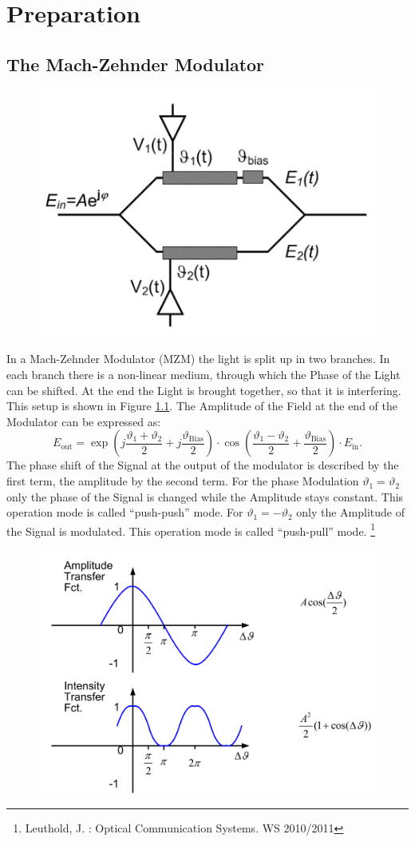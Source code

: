 \chapter{Preparation}
\section{The Mach-Zehnder Modulator}
\begin{figure}
  \centering
  \includegraphics[width=.5\columnwidth]{Grafiken/Mach-Zehnder.jpg}

\caption{}
\label{fig:MZI}
\end{figure}
In a Mach-Zehnder Modulator (MZM) the light is split up in two branches. In each branch there is a non-linear medium, through which the Phase of the Light can be shifted. At the end the Light is brought together, so that it is interfering. This setup is shown in Figure \ref{fig:MZI}. The Amplitude of the Field at the end of the Modulator can be expressed as:
\begin{equation}
 E_{\mathrm{out}}=\exp\left(j\frac{\vartheta_1+\vartheta_2}{2}+j\frac{\vartheta_{\mathrm{Bias}}}{2} \right)\cdot\cos\left(\frac{\vartheta_1-\vartheta_2}{2}+\frac{\vartheta_{\mathrm{Bias}}}{2}\right)\cdot E_{\mathrm{in}} .
\end{equation}
The phase shift of the Signal at the output of the modulator is described by the first term, the amplitude by the second term. For the phase Modulation $\vartheta_1 = \vartheta_2$ only the phase of the Signal is changed while the Amplitude stays constant. This operation mode is called "`push-push"' mode. For $\vartheta_1 = -\vartheta_2$ only the Amplitude of the Signal is modulated. This operation mode is called "`push-pull"' mode. \footnote[1]{Leuthold, J. : Optical Communication Systems. WS 2010/2011}


\begin{figure}
  \centering
  \includegraphics[width=.5\columnwidth]{Grafiken/Mach-Zender-Transfer.jpg}

\caption{}
\label{fig:MZI_plot}
\end{figure}


